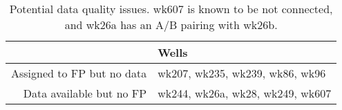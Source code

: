 \begin{table}[ht]
\centering
\begin{tabular}{rl}
  \hline
 & Wells \\ 
  \hline
Assigned to FP but no data & wk207, wk235, wk239, wk86, wk96 \\ 
  Data available but no FP & wk244, wk26a, wk28, wk249, wk607 \\ 
   \hline
\end{tabular}
\caption{Potential data quality issues. wk607 is known to be not connected, and wk26a has an A/B pairing with wk26b.} 
\label{tab:quality}
\end{table}
